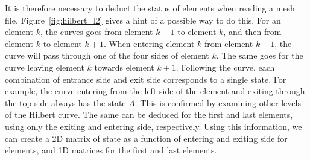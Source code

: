 It is therefore necessary to deduct the status of elements when reading a mesh file.
Figure~\ref{fig:hilbert_l2} gives a hint of a possible way to do this. For an element \(k\), the
curves goes from element \(k - 1\) to element \(k\), and then from element \(k\) to element \(k +
1\). When entering element \(k\) from element \(k - 1\), the curve will pass through one of the four
sides of element \(k\). The same goes for the curve leaving element \(k\) towards element \(k + 1\).
Following the curve, each combination of entrance side and exit side corresponds to a single state.
For example, the curve entering from the left side of the element and exiting through the top side
always has the state \(A\). This is confirmed by examining other levels of the Hilbert curve. The
same can be deduced for the first and last elements, using only the exiting and entering side,
respectively. Using this information, we can create a 2D matrix of state as a function of entering
and exiting side for elements, and 1D matrices for the first and last elements.

